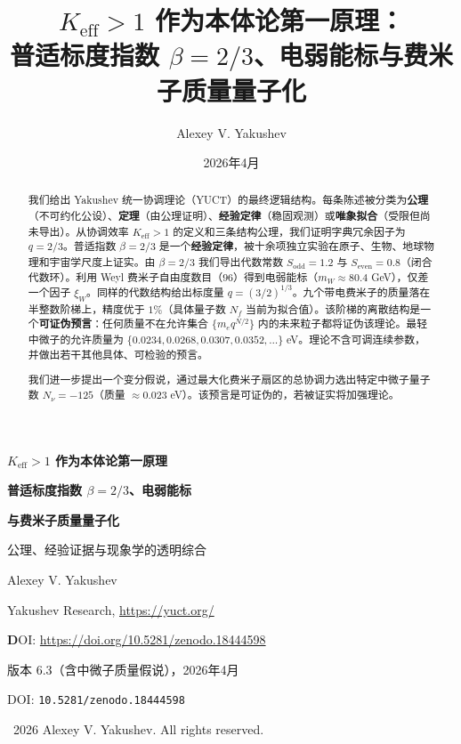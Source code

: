 \documentclass[12pt,a4paper]{article}
\title{\bfseries \(K_{\mathrm{eff}} > 1\) 作为本体论第一原理：\\
	普适标度指数 \(\beta = 2/3\)、电弱能标与费米子质量量子化}
\author{Alexey V. Yakushev}
\date{2026年4月}
\begin{document}
	
	\begin{titlepage}
		\centering
		\vspace*{1cm}
		
		{\Huge\bfseries \(K_{\mathrm{eff}} > 1\) 作为本体论第一原理\par}
		\vspace{0.3cm}
		{\Large\bfseries 普适标度指数 \(\beta = 2/3\)、电弱能标\par}
		\vspace{0.1cm}
		{\Large\bfseries 与费米子质量量子化\par}
		\vspace{0.5cm}
		{\large 公理、经验证据与现象学的透明综合\par}
		
		\vspace{1cm}
		
		{\large Alexey V. Yakushev\par}
		\vspace{0.3cm}
		{\normalsize Yakushev Research, \url{https://yuct.org/}\par}
		
		\vspace{0.3cm}
		\textbf DOI: \url{https://doi.org/10.5281/zenodo.18444598}
		
		\vspace{1.0cm}
		
		{\normalsize 版本 6.3（含中微子质量假说），2026年4月\par}
		\vspace{0.3cm}
		{\normalsize DOI: \texttt{10.5281/zenodo.18444598}\par}
		
		\vfill
		
		\begin{abstract}
			\noindent
			我们给出 Yakushev 统一协调理论（YUCT）的最终逻辑结构。每条陈述被分类为\textbf{公理}（不可约化公设）、\textbf{定理}（由公理证明）、\textbf{经验定律}（稳固观测）或\textbf{唯象拟合}（受限但尚未导出）。从协调效率 \(K_{\mathrm{eff}} > 1\) 的定义和三条结构公理，我们证明字典冗余因子为 \(q = 2/3\)。普适指数 \(\beta = 2/3\) 是一个\textbf{经验定律}，被十余项独立实验在原子、生物、地球物理和宇宙学尺度上证实。由 \(\beta = 2/3\) 我们导出代数常数 \(S_{\mathrm{odd}} = 1.2\) 与 \(S_{\mathrm{even}} = 0.8\)（闭合代数环）。利用 Weyl 费米子自由度数目（\(96\)）得到电弱能标（\(m_W \approx 80.4\) GeV），仅差一个因子 \(\xi_W\)。同样的代数结构给出标度量 \(q = (3/2)^{1/3}\)。九个带电费米子的质量落在半整数阶梯上，精度优于 \(1\%\)（具体量子数 \(N_f\) 当前为拟合值）。该阶梯的离散结构是一个\textbf{可证伪预言}：任何质量不在允许集合 \(\{m_e q^{N/2}\}\) 内的未来粒子都将证伪该理论。最轻中微子的允许质量为 \(\{0.0234, 0.0268, 0.0307, 0.0352, \dots\}\) eV。理论不含可调连续参数，并做出若干其他具体、可检验的预言。
			
			我们进一步提出一个变分假说，通过最大化费米子扇区的总协调力选出特定中微子量子数 \(N_{\nu} = -125\)（质量 \(\approx 0.023\) eV）。该预言是可证伪的，若被证实将加强理论。
		\end{abstract}
		
		\vspace{1cm}
		\textcopyright\ 2026 Alexey V. Yakushev. All rights reserved.
	\end{titlepage}
	
\end{document}
